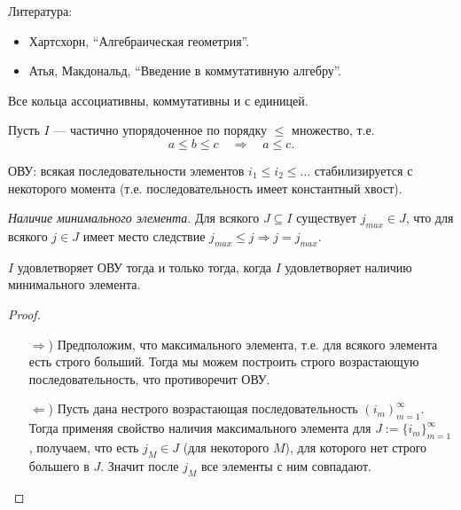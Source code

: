 \documentclass[12pt,a4paper]{article}
\date{}
\begin{document}
    \maketitle

    \listoftodos[TODOs]

    \tableofcontents

    \vspace{2em}
    Литература:
    \begin{itemize}
        \item Хартсхорн, ``Алгебраическая геометрия''.
        \item Атья, Макдональд, ``Введение в коммутативную алгебру''.
    \end{itemize}

    \begin{remark}
        Все кольца ассоциативны, коммутативны и с единицей.
    \end{remark}

    \begin{definition}
        Пусть $I$ --- частично упорядоченное по порядку $\leqslant$ множество, т.е.
        \[a \leqslant b \leqslant c \quad \Longrightarrow \quad a \leqslant c.\]

        ОВУ: всякая последовательности элементов $i_1 \leqslant i_2 \leqslant \dots$ стабилизируется с некоторого момента (т.е. последовательность имеет константный хвост).

        \emph{Наличие минимального элемента}. Для всякого $J \subseteq I$ существует $j_{max} \in J$, что для всякого $j \in J$ имеет место следствие $j_{max} \leqslant j \Rightarrow j = j_{max}$.
    \end{definition}

    \begin{lemma}
        $I$ удовлетворяет ОВУ тогда и только тогда, когда $I$ удовлетворяет наличию минимального элемента.
    \end{lemma}
    
    \begin{proof}
        \begin{itemize}
            \item[$\Rightarrow$)] Предположим, что максимального элемента, т.е. для всякого элемента есть строго больший. Тогда мы можем построить строго возрастающую последовательность, что противоречит ОВУ.
            \item[$\Leftarrow$)] Пусть дана нестрого возрастающая последовательность $(i_m)_{m=1}^\infty$. Тогда применяя свойство наличия максимального элемента для $J := \{i_m\}_{m=1}^\infty$, получаем, что есть $j_M \in J$ (для некоторого $M$), для которого нет строго большего в $J$. Значит после $j_M$ все элементы с ним совпадают. 
        \end{itemize}
    \end{proof}
\end{document}
